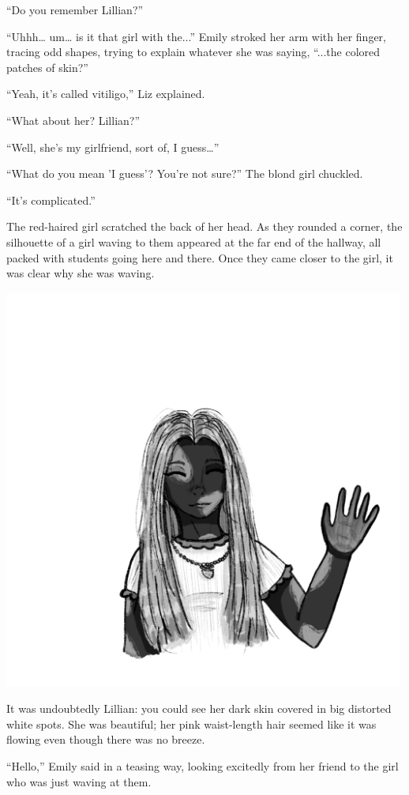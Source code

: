 “Do you remember Lillian?”

“Uhhh… um… is it that girl with the...” Emily stroked her arm with her finger, tracing odd shapes, trying to explain whatever she was saying, “...the colored patches of skin?”

“Yeah, it's called vitiligo,” Liz explained.

“What about her? Lillian?”

“Well, she's my girlfriend, sort of, I guess…”

“What do you mean 'I guess'? You're not sure?” The blond girl chuckled.

“It's complicated.”

The red-haired girl scratched the back of her head. As they rounded a corner, the silhouette of a girl waving to them appeared at the far end of the hallway, all packed with students going here and there. Once they came closer to the girl, it was clear why she was waving.

\includegraphics[width=0.99\textwidth]{Lillian.png}

It was undoubtedly Lillian: you could see her dark skin covered in big distorted white spots. She was beautiful; her pink waist-length hair seemed like it was flowing even though there was no breeze.

“Hello,” Emily said in a teasing way, looking excitedly from her friend to the girl who was just waving at them.

